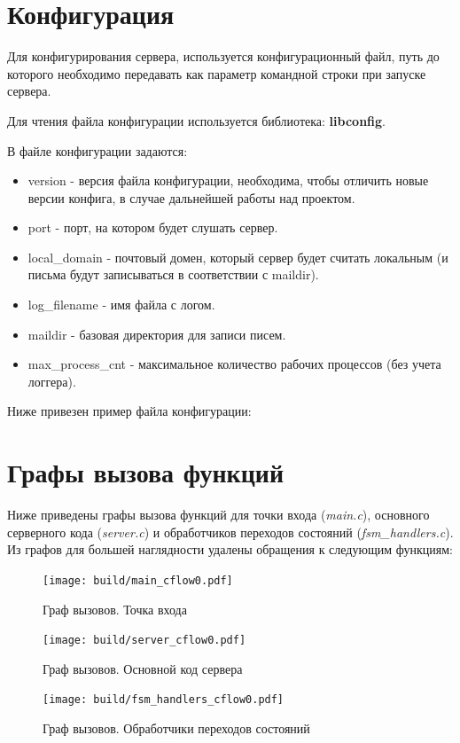 \documentclass[a4paper,12pt]{report}
\begin{document}
\section{Конфигурация}
Для конфигурирования сервера, используется конфигурационный файл, путь до которого необходимо передавать как параметр командной строки при запуске сервера. 

Для чтения файла конфигурации используется библиотека: \textbf{libconfig}.

В файле конфигурации задаются: 
\begin{itemize}
	\item version - версия файла конфигурации, необходима, чтобы отличить новые версии конфига, в случае дальнейшей работы над проектом.  
	\item port - порт, на котором будет слушать сервер.  
	\item local\_domain - почтовый домен, который сервер будет считать локальным (и письма будут записываться в соответствии с maildir).
	\item log\_filename - имя файла с логом. 
	\item maildir - базовая директория для записи писем.
	\item max\_process\_cnt - максимальное количество рабочих процессов (без учета логгера). 
\end{itemize}


Ниже привезен пример файла конфигурации:


\section{Графы вызова функций}
Ниже приведены графы вызова функций для точки входа (\textit{main.c}), основного серверного кода (\textit{server.c}) и обработчиков переходов состояний (\textit{fsm\_handlers.c}). Из графов для большей наглядности удалены обращения к следующим функциям: 



\begin{figure}[H]
	\texttt{[image: build/main\_cflow0.pdf]}
	\caption{Граф вызовов. Точка входа}
	\label{fig:cflow1}
\end{figure}

\begin{figure}[H]
	\texttt{[image: build/server\_cflow0.pdf]}
	\caption{Граф вызовов. Основной код сервера}
	\label{fig:cflow2}
\end{figure}
\begin{figure}[H]
	\texttt{[image: build/fsm\_handlers\_cflow0.pdf]}
	\caption{Граф вызовов. Обработчики переходов состояний}
	\label{fig:cflow3}
\end{figure}
\end{document}
